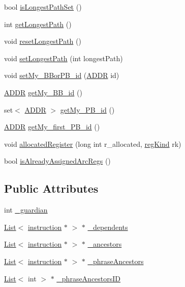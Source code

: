 \begin{DoxyCompactItemize}
\item 
bool \hyperlink{classinstruction_adc11181683114bd444eff11f1a810c89}{isLongestPathSet} ()
\item 
int \hyperlink{classinstruction_af4d93f837096be4e0dd2fe8951b1114e}{getLongestPath} ()
\item 
void \hyperlink{classinstruction_af6d861b0ad792c3136431c3ef99509ba}{resetLongestPath} ()
\item 
void \hyperlink{classinstruction_a46127cea18a5a4ec73566038a2454ecf}{setLongestPath} (int longestPath)
\item 
void \hyperlink{classinstruction_af78c579e9c3b74dfc72c5bbfb573deab}{setMy\_\-BBorPB\_\-id} (\hyperlink{binaryTranslator_2global_8h_aa4557b0650cb21e57e3e4623410832c6}{ADDR} id)
\item 
\hyperlink{binaryTranslator_2global_8h_aa4557b0650cb21e57e3e4623410832c6}{ADDR} \hyperlink{classinstruction_aee7e5e20a8bbb42a9efe26289a40eb89}{getMy\_\-BB\_\-id} ()
\item 
set$<$ \hyperlink{binaryTranslator_2global_8h_aa4557b0650cb21e57e3e4623410832c6}{ADDR} $>$ \hyperlink{classinstruction_a0e94c2270b46d453299f66a72b7c80de}{getMy\_\-PB\_\-id} ()
\item 
\hyperlink{binaryTranslator_2global_8h_aa4557b0650cb21e57e3e4623410832c6}{ADDR} \hyperlink{classinstruction_a36e1dd2192e97d1c771be8d0f0779d8c}{getMy\_\-first\_\-PB\_\-id} ()
\item 
void \hyperlink{classinstruction_a729d403d579a7f910a6ebfd6500ad5e9}{allocatedRegister} (long int r\_\-allocated, \hyperlink{binaryTranslator_2global_8h_a8981b18ef48c0d2dbf747e5e63e46038}{regKind} rk)
\item 
bool \hyperlink{classinstruction_ab5e9dd71fbc48781b528341a9a371a95}{isAlreadyAssignedArcRegs} ()
\end{DoxyCompactItemize}
\subsection*{Public Attributes}
\begin{DoxyCompactItemize}
\item 
int \hyperlink{classinstruction_a060702a038491fdd3e98661fec166fa4}{\_\-guardian}
\item 
\hyperlink{classList}{List}$<$ \hyperlink{classinstruction}{instruction} $\ast$ $>$ $\ast$ \hyperlink{classinstruction_a50304cae9052c65b138274a96edfbca0}{\_\-dependents}
\item 
\hyperlink{classList}{List}$<$ \hyperlink{classinstruction}{instruction} $\ast$ $>$ $\ast$ \hyperlink{classinstruction_ac1dd06cf09542ab004237f1dddd1da02}{\_\-ancestors}
\item 
\hyperlink{classList}{List}$<$ \hyperlink{classinstruction}{instruction} $\ast$ $>$ $\ast$ \hyperlink{classinstruction_a728468d228311067d26e390b263dc140}{\_\-phraseAncestors}
\item 
\hyperlink{classList}{List}$<$ int $>$ $\ast$ \hyperlink{classinstruction_a2631d0b5947d06f6ff13170e6dc88f78}{\_\-phraseAncestorsID}
\end{DoxyCompactItemize}



